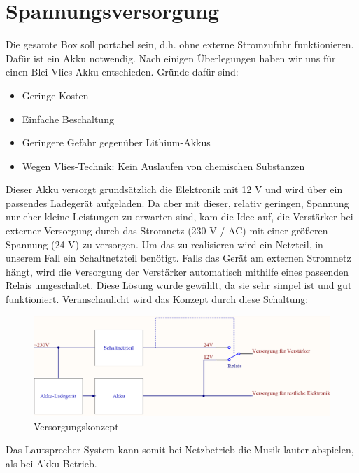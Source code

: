 \section{Spannungsversorgung}\label{sec:3.4}
Die gesamte Box soll portabel sein, d.h. ohne externe Stromzufuhr funktionieren.
Dafür ist ein Akku notwendig.
Nach einigen Überlegungen haben wir uns für einen Blei-Vlies-Akku entschieden.
Gründe dafür sind:
\begin{itemize}
	\item Geringe Kosten
	\item Einfache Beschaltung
	\item Geringere Gefahr gegenüber Lithium-Akkus
	\item Wegen Vlies-Technik: Kein Auslaufen von chemischen Substanzen
\end{itemize}
Dieser Akku versorgt grundsätzlich die Elektronik mit 12 V und wird über ein passendes Ladegerät aufgeladen.
Da aber mit dieser, relativ geringen, Spannung nur eher kleine Leistungen zu erwarten sind, kam die Idee auf, die Verstärker bei externer Versorgung durch das Stromnetz (230 V / AC) mit einer größeren Spannung (24 V) zu versorgen.
Um das zu realisieren wird ein Netzteil, in unserem Fall ein Schaltnetzteil benötigt.
Falls das Gerät am externen Stromnetz hängt, wird die Versorgung der Verstärker automatisch mithilfe eines passenden Relais umgeschaltet.
Diese Lösung wurde gewählt, da sie sehr simpel ist und gut funktioniert.
Veranschaulicht wird das Konzept durch diese Schaltung:
\begin{figure} [H]
	\centering	
	\includegraphics[width=1\textwidth]{img/Grundlagen/Versorgung.png}
	\caption{Versorgungskonzept}
	\label {fig:3.4.1}
\end{figure}
Das Lautsprecher-System kann somit bei Netzbetrieb die Musik lauter abspielen, als bei Akku-Betrieb.

